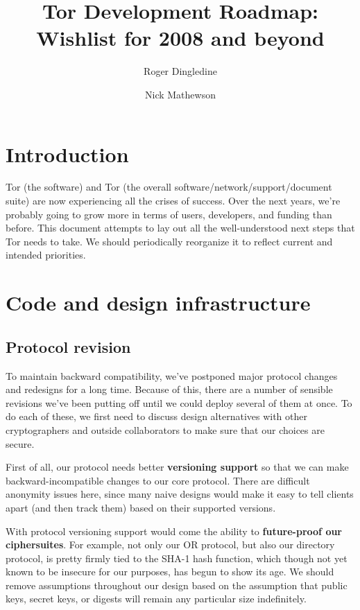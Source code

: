 \documentclass{article}
\begin{document}
\title{Tor Development Roadmap: Wishlist for 2008 and beyond}
\author{Roger Dingledine \and Nick Mathewson}

\maketitle
\pagestyle{plain}



\section{Introduction}

Tor (the software) and Tor (the overall software/network/support/document
suite) are now experiencing all the crises of success.  Over the next
years, we're probably going to grow more in terms of users, developers,
and funding than before. This document attempts to lay out all the
well-understood next steps that Tor needs to take. We should periodically
reorganize it to reflect current and intended priorities.

\section{Code and design infrastructure}

\subsection{Protocol revision}
To maintain backward compatibility, we've postponed major protocol
changes and redesigns for a long time.  Because of this, there are a number
of sensible revisions we've been putting off until we could deploy several of
them at once.  To do each of these, we first need to discuss design
alternatives with other cryptographers and outside collaborators to
make sure that our choices are secure.

First of all, our protocol needs better {\bf versioning support} so that we
can make backward-incompatible changes to our core protocol.  There are
difficult anonymity issues here, since many naive designs would make it easy
to tell clients apart (and then track them) based on their supported versions.

With protocol versioning support would come the ability to {\bf future-proof
  our ciphersuites}.  For example, not only our OR protocol, but also our
directory protocol, is pretty firmly tied to the SHA-1 hash function, which
though not yet known to be insecure for our purposes, has begun to show
its age.  We should
remove assumptions throughout our design based on the assumption that public
keys, secret keys, or digests will remain any particular size indefinitely.
\end{document}
